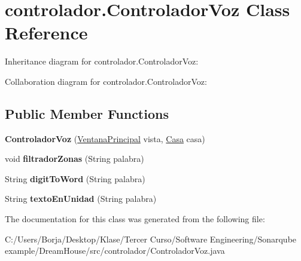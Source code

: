 \hypertarget{classcontrolador_1_1_controlador_voz}{}\section{controlador.\+Controlador\+Voz Class Reference}
\label{classcontrolador_1_1_controlador_voz}


Inheritance diagram for controlador.\+Controlador\+Voz\+:


Collaboration diagram for controlador.\+Controlador\+Voz\+:
\subsection*{Public Member Functions}
\begin{DoxyCompactItemize}
\item 
\mbox{\label{classcontrolador_1_1_controlador_voz_a6cda936ee3d81085740a81c018803bf7}} 
{\bfseries Controlador\+Voz} (\mbox{\hyperlink{classvista_1_1_ventana_principal}{Ventana\+Principal}} vista, \mbox{\hyperlink{classmodelo_1_1_casa}{Casa}} casa)
\item 
\mbox{\label{classcontrolador_1_1_controlador_voz_a77d8d66f1bbe3174d4df8a5c171cc4c5}} 
void {\bfseries filtrador\+Zonas} (String palabra)
\item 
\mbox{\label{classcontrolador_1_1_controlador_voz_a069bc1084f39b2c10a069731b353f6da}} 
String {\bfseries digit\+To\+Word} (String palabra)
\item 
\mbox{\label{classcontrolador_1_1_controlador_voz_a7a526053d4d5fce89ad3f9bd68f39ee1}} 
String {\bfseries texto\+En\+Unidad} (String palabra)
\end{DoxyCompactItemize}


The documentation for this class was generated from the following file\+:\begin{DoxyCompactItemize}
\item 
C\+:/\+Users/\+Borja/\+Desktop/\+Klase/\+Tercer Curso/\+Software Engineering/\+Sonarqube example/\+Dream\+House/src/controlador/Controlador\+Voz.\+java\end{DoxyCompactItemize}
